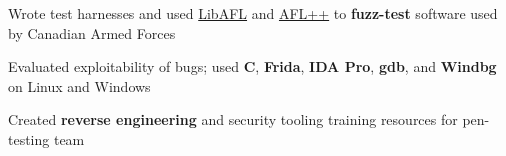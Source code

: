 \begin{cventries}
{\begin{cvitems}
        \item{Wrote test harnesses and used \href{https://aflplus.plus/libafl-book/}{LibAFL} and \href{https://aflplus.plus}{AFL++} to \textbf{fuzz-test} software used by Canadian Armed Forces}
        \item{Evaluated exploitability of bugs; used \textbf{C}, \textbf{Frida}, \textbf{IDA Pro}, \textbf{gdb}, and \textbf{Windbg} on Linux and Windows}
        \item{Created \textbf{reverse engineering} and security tooling training resources for pen-testing team} %
      \end{cvitems}
    }


\end{cventries}
